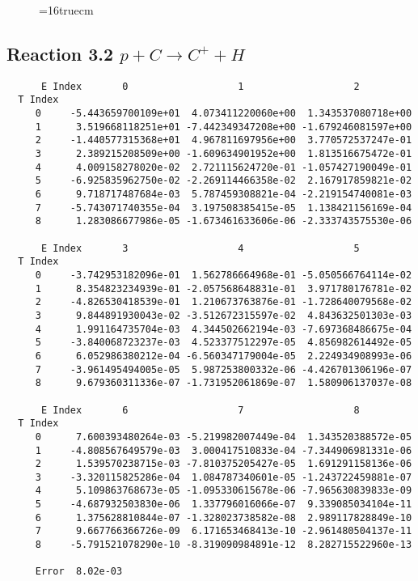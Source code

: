 \documentclass[12pt]{article}
\begin{document}
\begin{figure} \label{met.3_3.1.4}
\epsfxsize=16truecm
\end{figure}
\newpage
 
 
\subsection{ 
Reaction 3.2      $p + C \rightarrow C^+ + H$
}

 
\begin{small}\begin{verbatim} 
      E Index       0                   1                   2
  T Index
     0     -5.443659700109e+01  4.073411220060e+00  1.343537080718e+00
     1      3.519668118251e+01 -7.442349347208e+00 -1.679246081597e+00
     2     -1.440577315368e+01  4.967811697956e+00  3.770572537247e-01
     3      2.389215208509e+00 -1.609634901952e+00  1.813516675472e-01
     4      4.009158278020e-02  2.721115624720e-01 -1.057427190049e-01
     5     -6.925835962750e-02 -2.269114466358e-02  2.167917859821e-02
     6      9.718717487684e-03  5.787459308821e-04 -2.219154740081e-03
     7     -5.743071740355e-04  3.197508385415e-05  1.138421156169e-04
     8      1.283086677986e-05 -1.673461633606e-06 -2.333743575530e-06
 
      E Index       3                   4                   5
  T Index
     0     -3.742953182096e-01  1.562786664968e-01 -5.050566764114e-02
     1      8.354823234939e-01 -2.057568648831e-01  3.971780176781e-02
     2     -4.826530418539e-01  1.210673763876e-01 -1.728640079568e-02
     3      9.844891930043e-02 -3.512672315597e-02  4.843632501303e-03
     4      1.991164735704e-03  4.344502662194e-03 -7.697368486675e-04
     5     -3.840068723237e-03  4.523377512297e-05  4.856982614492e-05
     6      6.052986380212e-04 -6.560347179004e-05  2.224934908993e-06
     7     -3.961495494005e-05  5.987253800332e-06 -4.426701306196e-07
     8      9.679360311336e-07 -1.731952061869e-07  1.580906137037e-08
 
      E Index       6                   7                   8
  T Index
     0      7.600393480264e-03 -5.219982007449e-04  1.343520388572e-05
     1     -4.808567649579e-03  3.000417510833e-04 -7.344906981331e-06
     2      1.539570238715e-03 -7.810375205427e-05  1.691291158136e-06
     3     -3.320115825286e-04  1.084787340601e-05 -1.243722459881e-07
     4      5.109863768673e-05 -1.095330615678e-06 -7.965630839833e-09
     5     -4.687932503830e-06  1.337796016066e-07  9.339085034104e-11
     6      1.375628810844e-07 -1.328023738582e-08  2.989117828849e-10
     7      9.667766366726e-09  6.171653468413e-10 -2.961480504137e-11
     8     -5.791521078290e-10 -8.319090984891e-12  8.282715522960e-13
 
     Error  8.02e-03
\end{verbatim}\end{small}
\end{document}
